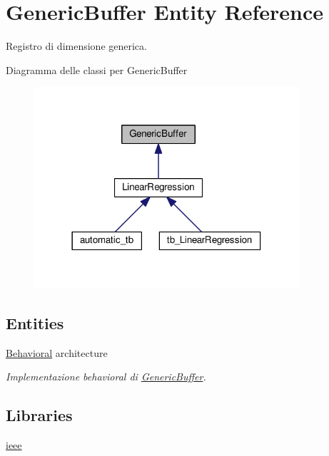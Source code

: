 \hypertarget{class_generic_buffer}{}\section{Generic\+Buffer Entity Reference}
\label{class_generic_buffer}


Registro di dimensione generica.  




Diagramma delle classi per Generic\+Buffer\nopagebreak
\begin{figure}[H]
\begin{center}
\leavevmode
\includegraphics[width=278pt]{class_generic_buffer__inherit__graph}
\end{center}
\end{figure}
\subsection*{Entities}
\begin{DoxyCompactItemize}
\item 
\hyperlink{class_generic_buffer_1_1_behavioral}{Behavioral} architecture
\begin{DoxyCompactList}\small\item\em Implementazione behavioral di \hyperlink{class_generic_buffer}{Generic\+Buffer}. \end{DoxyCompactList}\end{DoxyCompactItemize}
\subsection*{Libraries}
 \begin{DoxyCompactItemize}
\item 
\hyperlink{group___generic_buffer_ga0a6af6eef40212dbaf130d57ce711256}{ieee} 
\end{DoxyCompactItemize}
